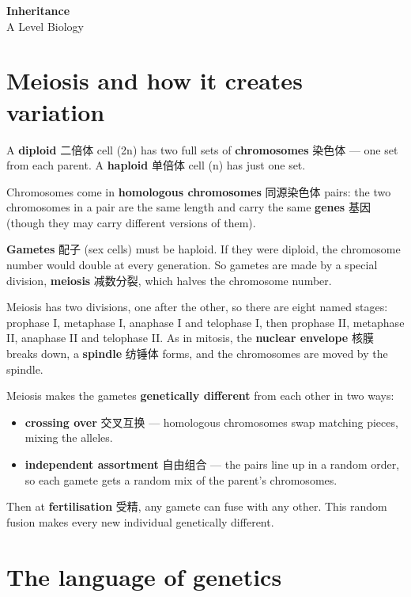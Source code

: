 \documentclass[11pt]{article}
\begin{document}
\begin{center}
  {\LARGE\bfseries Inheritance}\\[0.35em]
  {\large A Level Biology}
\end{center}
\vspace{0.6em}

\section*{Meiosis and how it creates variation}

A \textbf{diploid} 二倍体 cell (2n) has two full sets of \textbf{chromosomes} 染色体 — one set from each parent. A \textbf{haploid} 单倍体 cell (n) has just one set.

Chromosomes come in \textbf{homologous chromosomes} 同源染色体 pairs: the two chromosomes in a pair are the same length and carry the same \textbf{genes} 基因 (though they may carry different versions of them).

\textbf{Gametes} 配子 (sex cells) must be haploid. If they were diploid, the chromosome number would double at every generation. So gametes are made by a special division, \textbf{meiosis} 减数分裂, which halves the chromosome number.

Meiosis has two divisions, one after the other, so there are eight named stages: prophase I, metaphase I, anaphase I and telophase I, then prophase II, metaphase II, anaphase II and telophase II. As in mitosis, the \textbf{nuclear envelope} 核膜 breaks down, a \textbf{spindle} 纺锤体 forms, and the chromosomes are moved by the spindle.

Meiosis makes the gametes \textbf{genetically different} from each other in two ways:

\begin{itemize}
\item \textbf{crossing over} 交叉互换 — homologous chromosomes swap matching pieces, mixing the alleles.

\item \textbf{independent assortment} 自由组合 — the pairs line up in a random order, so each gamete gets a random mix of the parent's chromosomes.

\end{itemize}

Then at \textbf{fertilisation} 受精, any gamete can fuse with any other. This random fusion makes every new individual genetically different.

\section*{The language of genetics}
\end{document}
